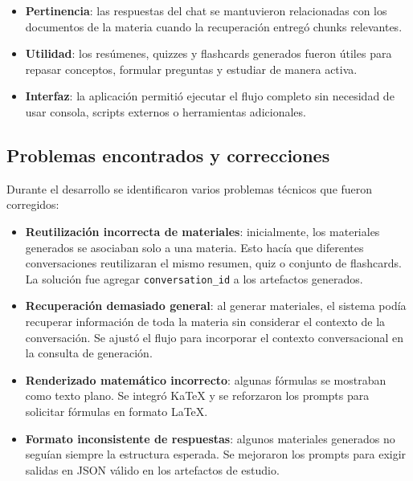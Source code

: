 \documentclass[12pt, letterpaper]{article}
\begin{document}
	\begin{itemize}
		\item \textbf{Pertinencia}: las respuestas del chat se mantuvieron relacionadas con los documentos de la materia cuando la recuperación entregó chunks relevantes.
		
		\item \textbf{Utilidad}: los resúmenes, quizzes y flashcards generados fueron útiles para repasar conceptos, formular preguntas y estudiar de manera activa.
		
		\item \textbf{Interfaz}: la aplicación permitió ejecutar el flujo completo sin necesidad de usar consola, scripts externos o herramientas adicionales.
	\end{itemize}
	
	\subsection{Problemas encontrados y correcciones}
	
	Durante el desarrollo se identificaron varios problemas técnicos que fueron corregidos:
	
	\begin{itemize}
		\item \textbf{Reutilización incorrecta de materiales}: inicialmente, los materiales generados se asociaban solo a una materia. Esto hacía que diferentes conversaciones reutilizaran el mismo resumen, quiz o conjunto de flashcards. La solución fue agregar \texttt{conversation\_id} a los artefactos generados.
		
		\item \textbf{Recuperación demasiado general}: al generar materiales, el sistema podía recuperar información de toda la materia sin considerar el contexto de la conversación. Se ajustó el flujo para incorporar el contexto conversacional en la consulta de generación.
		
		\item \textbf{Renderizado matemático incorrecto}: algunas fórmulas se mostraban como texto plano. Se integró KaTeX y se reforzaron los prompts para solicitar fórmulas en formato LaTeX.
		
		\item \textbf{Formato inconsistente de respuestas}: algunos materiales generados no seguían siempre la estructura esperada. Se mejoraron los prompts para exigir salidas en JSON válido en los artefactos de estudio.
	\end{itemize}
	
\end{document}

